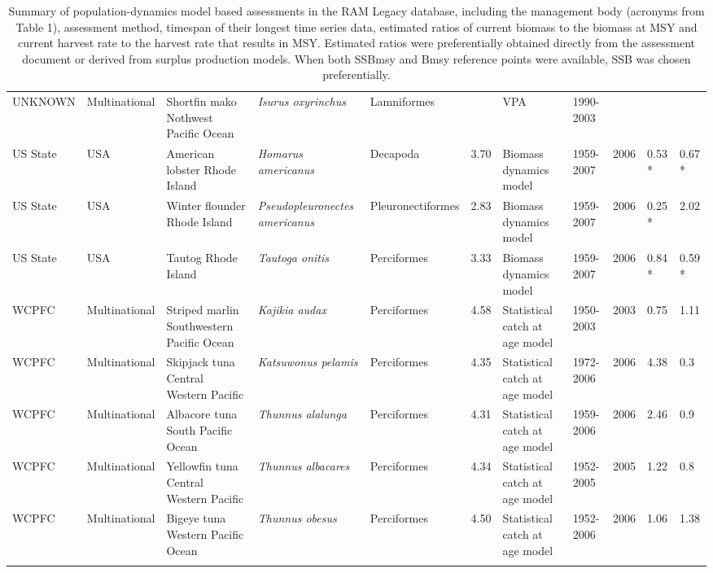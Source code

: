 \begin{longtable}{p{1.5cm}p{1.5cm}p{3cm}p{3cm}p{2.5cm}p{0.9cm}p{1.4cm}p{0.9cm}p{0.9cm}p{0.9cm}p{1cm}}
  UNKNOWN & Multinational & Shortfin mako Nothwest Pacific Ocean & \textit{Isurus oxyrinchus} & Lamniformes &  & VPA & 1990-2003 &  &  &  \\ 
  US State & USA & American lobster Rhode Island & \textit{Homarus americanus} & Decapoda & 3.70 & Biomass dynamics model & 1959-2007 & 2006 & 0.53 * & 0.67 * \\ 
  US State & USA & Winter flounder Rhode Island & \textit{Pseudopleuronectes americanus} & Pleuronectiformes & 2.83 & Biomass dynamics model & 1959-2007 & 2006 & 0.25 * & 2.02 \\ 
  US State & USA & Tautog Rhode Island & \textit{Tautoga onitis} & Perciformes & 3.33 & Biomass dynamics model & 1959-2007 & 2006 & 0.84 * & 0.59 * \\ 
  WCPFC & Multinational & Striped marlin Southwestern Pacific Ocean & \textit{Kajikia audax} & Perciformes & 4.58 & Statistical catch at age model & 1950-2003 & 2003 & 0.75 & 1.11 \\ 
  WCPFC & Multinational & Skipjack tuna Central Western Pacific & \textit{Katsuwonus pelamis} & Perciformes & 4.35 & Statistical catch at age model & 1972-2006 & 2006 & 4.38 & 0.3 \\ 
  WCPFC & Multinational & Albacore tuna South Pacific Ocean & \textit{Thunnus alalunga} & Perciformes & 4.31 & Statistical catch at age model & 1959-2006 & 2006 & 2.46 & 0.9 \\ 
  WCPFC & Multinational & Yellowfin tuna Central Western Pacific & \textit{Thunnus albacares} & Perciformes & 4.34 & Statistical catch at age model & 1952-2005 & 2005 & 1.22 & 0.8 \\ 
  WCPFC & Multinational & Bigeye tuna Western Pacific Ocean & \textit{Thunnus obesus} & Perciformes & 4.50 & Statistical catch at age model & 1952-2006 & 2006 & 1.06 & 1.38 \\ 
   \hline
\hline
\caption{Summary of population-dynamics model based assessments in the RAM Legacy database, including the management body (acronyms from Table 1), assessment method, timespan of their longest time series data, estimated ratios of current biomass to the biomass at MSY and current harvest rate to the harvest rate that results in MSY. Estimated ratios were preferentially obtained directly from the assessment document or derived from surplus production models. When both SSBmsy and Bmsy reference points were available, SSB was chosen preferentially.}
\label{tab:crosshair}
\end{longtable}
